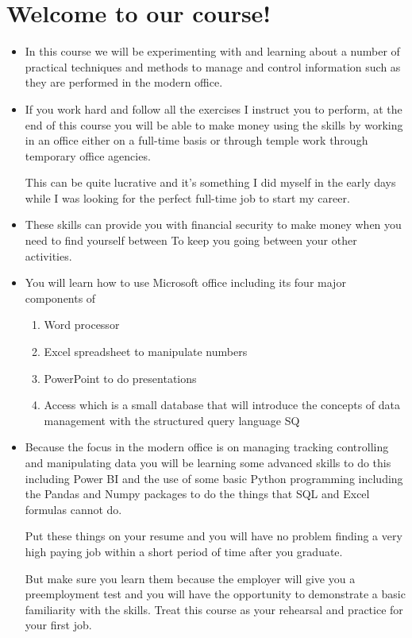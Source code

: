 \section * {Welcome to our course!}
\large

\begin{itemize}
    \item In this course we will be experimenting with and learning about a number of practical techniques and methods to manage and control information such as they are performed in the modern office.
    \item If you work hard and follow all the exercises I instruct you to perform, at the end of this course you will be able to make money using the skills by working in an office either on a full-time basis or through temple work through temporary office agencies.    
    
    This can be quite lucrative and it's something I did myself in the early days while I was looking for the perfect full-time job to start my career.
    
    \item These skills can provide you with financial security to make money when you need to find yourself between To keep you going between your other activities.
    
    \item You will learn how to use Microsoft office including its four major components of 
        \begin{enumerate}
            \item Word processor
            \item Excel spreadsheet to manipulate numbers   
            \item PowerPoint to do presentations   
            \item Access which is a small database that will introduce the concepts of data management with the structured query language SQ   
        \end{enumerate}
    \item 
    
Because the focus in the modern office is on managing tracking controlling and manipulating data you will be learning some advanced skills to do this including Power BI and the use of some basic Python programming including the Pandas and Numpy packages to do the things that SQL and Excel formulas cannot do. \newline

Put these things on your resume and you will have no problem finding a very high paying job within a short period of time after you graduate. \newline

But make sure you learn them because the employer will give you a preemployment test and you will have the opportunity to demonstrate a basic familiarity with the skills. Treat this course as your rehearsal and practice for your first job.
\end{itemize}




